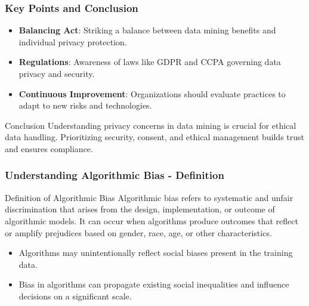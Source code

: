 \documentclass[aspectratio=169]{beamer}
\begin{document}
\begin{frame}[fragile]
    \frametitle{Key Points and Conclusion}
    \begin{itemize}
        \item \textbf{Balancing Act}: Striking a balance between data mining benefits and individual privacy protection.
        \item \textbf{Regulations}: Awareness of laws like GDPR and CCPA governing data privacy and security.
        \item \textbf{Continuous Improvement}: Organizations should evaluate practices to adapt to new risks and technologies.
    \end{itemize}

    \begin{block}{Conclusion}
        Understanding privacy concerns in data mining is crucial for ethical data handling. Prioritizing security, consent, and ethical management builds trust and ensures compliance.
    \end{block}
\end{frame}

\begin{frame}[fragile]
    \frametitle{Understanding Algorithmic Bias - Definition}
    \begin{block}{Definition of Algorithmic Bias}
        Algorithmic bias refers to systematic and unfair discrimination that arises from the design, implementation, or outcome of algorithmic models. It can occur when algorithms produce outcomes that reflect or amplify prejudices based on gender, race, age, or other characteristics. 
    \end{block}
    
    \begin{itemize}
        \item Algorithms may unintentionally reflect social biases present in the training data.
        \item Bias in algorithms can propagate existing social inequalities and influence decisions on a significant scale.
    \end{itemize}
\end{frame}
\end{document}
